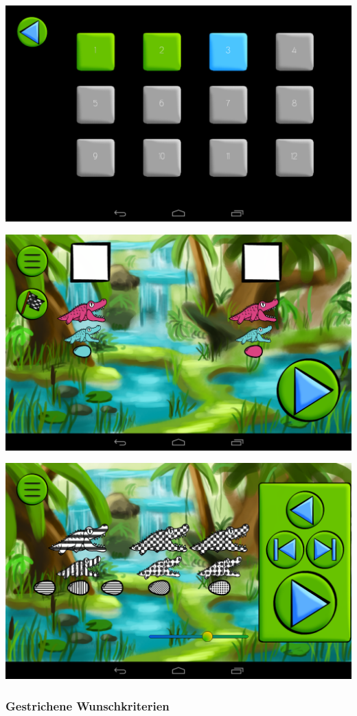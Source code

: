 \documentclass[t]{beamer}
\begin{document}
\begin{frame}
	\includegraphics[width=\textwidth]{images/screenshots/levels}
\end{frame}

\begin{frame}
	\includegraphics[width=\textwidth]{images/screenshots/multiple_choice}
\end{frame}

\begin{frame}
	\includegraphics[width=\textwidth]{images/screenshots/colorblind}
\end{frame}

\begin{frame}
	\frametitle{Gestrichene Wunschkriterien}
\end{frame}
\end{document}
